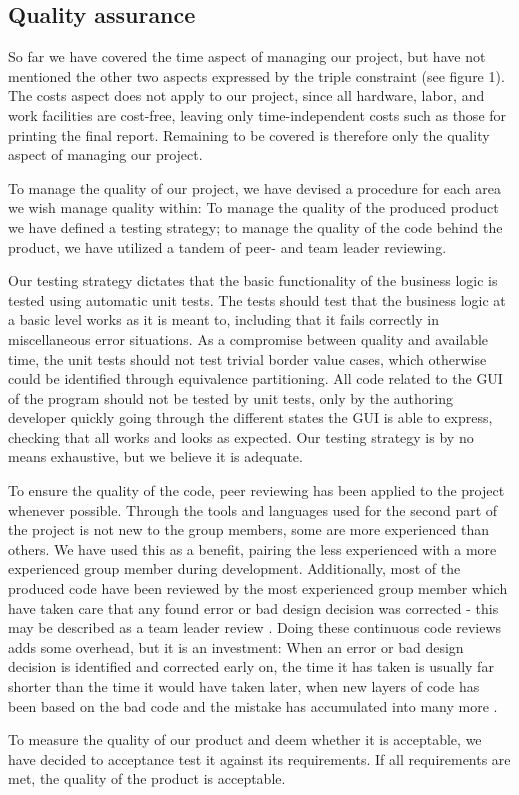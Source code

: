 \subsection{Quality assurance}

So far we have covered the time aspect of managing our project, but have not mentioned the other two aspects expressed by the triple constraint (see figure 1).
The costs aspect does not apply to our project, since all hardware, labor, and work facilities are cost-free, leaving only time-independent costs such as those for printing the final report.
Remaining to be covered is therefore only the quality aspect of managing our project.

To manage the quality of our project, we have devised a procedure for each area we wish manage quality within: To manage the quality of the produced product we have defined a testing strategy; to manage the quality of the code behind the product, we have utilized a tandem of peer- and team leader reviewing.

Our testing strategy dictates that the basic functionality of the business logic is tested using automatic unit tests. The tests should test that the business logic at a basic level works as it is meant to, including that it fails correctly in miscellaneous error situations.
As a compromise between quality and available time, the unit tests should not test trivial border value cases, which otherwise could be identified through equivalence partitioning.
All code related to the GUI of the program should not be tested by unit tests, only by the authoring developer quickly going through the different states the GUI is able to express, checking that all works and looks as expected.
Our testing strategy is by no means exhaustive, but we believe it is adequate.

To ensure the quality of the code, peer reviewing has been applied to the project whenever possible. Through the tools and languages used for the second part of the project is not new to the group members, some are more experienced than others.
We have used this as a benefit, pairing the less experienced with a more experienced group member during development. Additionally, most of the produced code have been reviewed by the most experienced group member which have taken care that any found error or bad design decision was corrected - this may be described as a team leader review \cite[p. 199]{pm}.
Doing these continuous code reviews adds some overhead, but it is an investment: When an error or bad design decision is identified and corrected early on, the time it has taken is usually far shorter than the time it would have taken later, when new layers of code has been based on the bad code and the mistake has accumulated into many more \cite[p. 247]{?}.

To measure the quality of our product and deem whether it is acceptable, we have decided to acceptance test it against its requirements. If all requirements are met, the quality of the product is acceptable.
